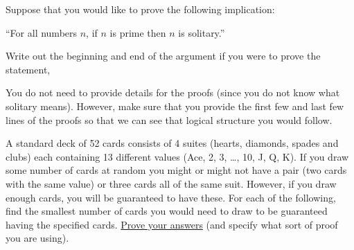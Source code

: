\begin{questions}

  \question[9] Suppose that you would like to prove the following implication:
  \begin{center}
  ``For all numbers $n$, if $n$ is prime then $n$ is solitary.''
  \end{center}
  Write out the beginning and end of the argument if you were to prove the statement,
  You do not need to provide details for the proofs (since you do not know what solitary means). However, make sure that you provide the first few and last few lines of the proofs so that we can see that logical structure you would follow.



  \question[9] A standard deck of 52 cards consists of 4 suites (hearts, diamonds, spades and clubs) each containing 13 different values (Ace, 2, 3, \ldots, 10, J, Q, K).  If you draw some number of cards at random you might or might not have a pair (two cards with the same value) or three cards all of the same suit.  However, if you draw enough cards, you will be guaranteed to have these.  For each of the following, find the smallest number of cards you would need to draw to be guaranteed having the specified cards.  \underline{Prove your answers} (and specify what sort of proof you are using).
  \begin{parts}

\end{parts}
\end{questions}
